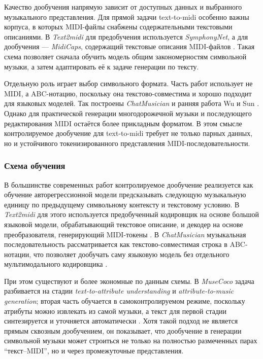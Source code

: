 \documentclass[a4paper,12pt]{extarticle}
\begin{document}
Качество дообучения напрямую зависит от доступных данных и выбранного
музыкального представления. Для прямой задачи text-to-midi особенно
важны корпуса, в которых MIDI-файлы снабжены содержательными текстовыми
описаниями. В \textit{Text2midi} для предобучения используется
\textit{SymphonyNet}, а для дообучения --- \textit{MidiCaps},
содержащий текстовые описания MIDI-файлов
\cite{text2midi2025,midicaps2024}. Такая схема позволяет сначала
обучить модель общим закономерностям символьной музыки, а затем
адаптировать её к задаче генерации по тексту.

Отдельную роль играет выбор символьного формата. Часть работ использует
не MIDI, а ABC-нотацию, поскольку она текстово-совместима и хорошо
подходит для языковых моделей. Так построены \textit{ChatMusician} и
ранняя работа Wu и Sun \cite{chatmusician2024,wu2022texttomusic}.
Однако для практической генерации многодорожечной музыки и последующего
редактирования MIDI остаётся более прикладным форматом. В этом смысле
контролируемое дообучение для text-to-midi требует не только парных
данных, но и устойчивого токенизированного представления
MIDI-последовательности.

\subsubsection{Схема обучения}

В большинстве современных работ контролируемое дообучение реализуется
как обучение авторегрессионной модели предсказывать следующую
музыкальную единицу по предыдущему символьному контексту и текстовому
условию. В \textit{Text2midi} для этого используется предобученный
кодировщик на основе большой языковой модели, обрабатывающий текстовое
описание, и декодер на основе преобразователя, генерирующий MIDI-токены
\cite{text2midi2025}. В \textit{ChatMusician} музыкальная
последовательность рассматривается как текстово-совместимая строка в
ABC-нотации, что позволяет дообучать саму языковую модель без отдельного
мультимодального кодировщика \cite{chatmusician2024}.

При этом существуют и более экономные по данным схемы. В
\textit{MuseCoco} задача разбивается на стадии
\textit{text-to-attribute understanding} и
\textit{attribute-to-music generation}; вторая часть обучается в
самоконтролируемом режиме, поскольку атрибуты можно извлекать из самой
музыки, а текст для первой стадии синтезируется и уточняется
автоматически \cite{musecoco2023}. Хотя такой подход не является прямым
сквозным дообучением, он показывает, что дообучение в генерации
символьной музыки может строиться не только на полностью размеченных
парах ``текст--MIDI'', но и через промежуточные представления.
\end{document}
